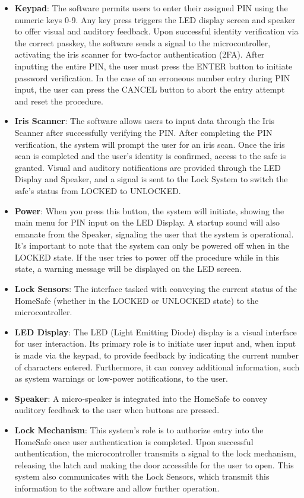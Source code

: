 \documentclass{article}
\begin{document}
\begin{itemize}
    \item \textbf{Keypad}: The software permits users to enter their assigned PIN using the numeric keys 0-9. Any key press triggers the LED display screen and speaker to offer visual and auditory feedback. Upon successful identity verification via the correct passkey, the software sends a signal to the microcontroller, activating the iris scanner for two-factor authentication (2FA). After inputting the entire PIN, the user must press the ENTER button to initiate password verification. In the case of an erroneous number entry during PIN input, the user can press the CANCEL button to abort the entry attempt and reset the procedure.
    \item \textbf{Iris Scanner}: The software allows users to input data through the Iris Scanner after successfully verifying the PIN. After completing the PIN verification, the system will prompt the user for an iris scan. Once the iris scan is completed and the user's identity is confirmed, access to the safe is granted. Visual and auditory notifications are provided through the LED Display and Speaker, and a signal is sent to the Lock System to switch the safe's status from LOCKED to UNLOCKED.
    \item \textbf{Power}: When you press this button, the system will initiate, showing the main menu for PIN input on the LED Display. A startup sound will also emanate from the Speaker, signaling the user that the system is operational. It's important to note that the system can only be powered off when in the LOCKED state. If the user tries to power off the procedure while in this state, a warning message will be displayed on the LED screen.
    \item \textbf{Lock Sensors}: The interface tasked with conveying the current status of the HomeSafe (whether in the LOCKED or UNLOCKED state) to the microcontroller.
    \item \textbf{LED Display}: The LED (Light Emitting Diode) display is a visual interface for user interaction. Its primary role is to initiate user input and, when input is made via the keypad, to provide feedback by indicating the current number of characters entered. Furthermore, it can convey additional information, such as system warnings or low-power notifications, to the user.
    \item \textbf{Speaker}: A micro-speaker is integrated into the HomeSafe to convey auditory feedback to the user when buttons are pressed.
    \item \textbf{Lock Mechanism}: This system's role is to authorize entry into the HomeSafe once user authentication is completed. Upon successful authentication, the microcontroller transmits a signal to the lock mechanism, releasing the latch and making the door accessible for the user to open. This system also communicates with the Lock Sensors, which transmit this information to the software and allow further operation.
    
\end{itemize}
\end{document}
